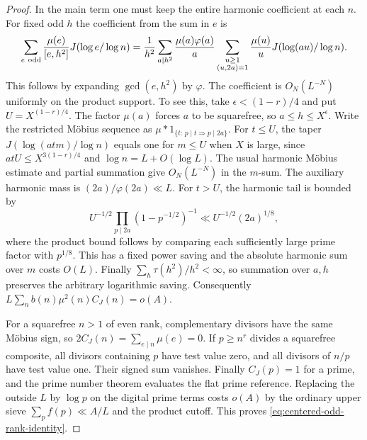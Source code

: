\documentclass[11pt,a4paper]{article}
\theoremstyle{paperplain}
\numberwithin{equation}{section}
\begin{document}
\begin{proof}
In the main term one must keep the entire harmonic coefficient
at each $n$. For fixed odd $h$ the coefficient from the sum
in $e$ is
\[
 \sum_{e\ {\rm odd}}\frac{\mu(e)}{[e,h^2]}J(\log e/\log n)
 =\frac1{h^2}\sum_{a\mid h^2}\frac{\mu(a)\varphi(a)}a
         \sum_{\substack{u\ge1\\(u,2a)=1}}
                  \frac{\mu(u)}u J(\log(au)/\log n).
\]
This follows by expanding $\gcd(e,h^2)$ by $\varphi$.
The coefficient is $O_N(L^{-N})$ uniformly on the product support.
To see this, take $\epsilon<(1-r)/4$ and put $U=X^{(1-r)/4}$.
The factor $\mu(a)$ forces $a$ to be squarefree, so $a\le h\le X^\epsilon$.
Write the restricted M\"obius sequence as $\mu*1_{\{t:\,p\mid t\Rightarrow p\mid 2a\}}$.
For $t\le U$, the taper $J(\log(atm)/\log n)$ equals one for $m\le U$
when $X$ is large, since $atU\le X^{3(1-r)/4}$ and
$\log n=L+O(\log L)$. The usual harmonic M\"obius estimate and partial
summation give $O_N(L^{-N})$ in the $m$-sum. The auxiliary harmonic
mass is $(2a)/\varphi(2a)\ll L$. For $t>U$, the harmonic tail is bounded by
\[
 U^{-1/2}\prod_{p\mid 2a}(1-p^{-1/2})^{-1}
 \ll U^{-1/2}(2a)^{1/8},
\]
where the product bound follows by comparing each sufficiently large
prime factor with $p^{1/8}$. This has a fixed power saving and the
absolute harmonic sum over $m$ costs $O(L)$. Finally
$\sum_h\tau(h^2)/h^2<\infty$, so summation over $a,h$ preserves the
arbitrary logarithmic saving.
Consequently $L\sum_n b(n)\mu^2(n)C_J(n)=o(A)$.

For a squarefree $n>1$ of even rank, complementary divisors
have the same M\"obius sign, so $2C_J(n)=\sum_{e\mid n}\mu(e)=0$.
If $p\ge n^r$ divides a squarefree composite, all divisors
containing $p$ have test value zero, and all divisors of
$n/p$ have test value one. Their signed sum vanishes.
Finally $C_J(p)=1$ for a prime, and the prime number theorem
evaluates the flat prime reference. Replacing the outside
$L$ by $\log p$ on the digital prime terms costs $o(A)$
by the ordinary upper sieve $\sum_p f(p)\ll A/L$ and the
product cutoff. This proves \eqref{eq:centered-odd-rank-identity}.
\end{proof}
\end{document}
